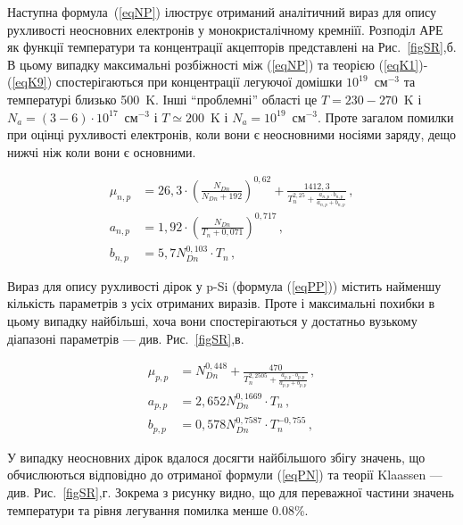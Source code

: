 \documentclass[14pt,a4paper,titlepage,oneside]{book}
\numberwithin{equation}{part}
\begin{document}
Наступна формула~(\ref{eqNP}) ілюструє отриманий аналітичний вираз для опису рухливості неосновних електронів у
монокристалічному кремніїї.
Розподіл АРЕ як функції температури та концентрації акцепторів представлені на Рис.~\ref{figSR},б.
В цьому випадку максимальні розбіжності між (\ref{eqNP}) та теорією (\ref{eqK1})-(\ref{eqK9}) спостерігаються при
концентрації легуючої домішки $10^{19}$~см$^{-3}$ та температурі близько 500~K.
Інші ``проблемні'' області це $T=230-270$~K і $N_a=(3-6)\cdot 10^{17}$~см$^{-3}$ і
$T\simeq200$~K і $N_a=10^{19}$~см$^{-3}$.
Проте загалом помилки при оцінці рухливості електронів, коли вони є неосновними носіями заряду, дещо нижчі
ніж коли вони є основними.

\begin{subequations} \label{eqNP}
    \begin{align}
      \mu_{n,p}& =26,3\cdot\left(\frac{N_{Dn}}{N_{Dn}+192}\right)^{0,62}+\frac{1412,3}{T_n^{2,25}+\frac{a_{n,p}\cdot b_{n,p}}{a_{n,p}+b_{n,p}}}\,, \label{eqNPa} \\
      a_{n,p} &=1,92\cdot\left(\frac{N_{Dn}}{T_n+0,071}\right)^{0,717}\,, \label{eqNPb} \\
      b_{n,p}& =5,7N_{Dn}^{0,103}\cdot T_n\,, \label{eqNPc}
    \end{align}
\end{subequations}

Вираз для опису рухливості дірок у p-Si (формула (\ref{eqPP})) містить найменшу кількість параметрів з усіх отриманих виразів.
Проте і максимальні похибки в цьому випадку найбільші, хоча вони спостерігаються у достатньо вузькому діапазоні
параметрів --- див. Рис.~\ref{figSR},в.

\begin{subequations} \label{eqPP}
    \begin{align}
      \mu_{p,p}& =N_{Dn}^{0,448}+\frac{470}{T_n^{2,2505}+\frac{a_{p,p}\cdot b_{p,p}}{a_{p,p}+b_{p,p}}}\,, \label{eqPPa} \\
      a_{p,p} &=2,652 N_{Dn}^{0,1669}\cdot T_n\,, \label{eqPPb} \\
      b_{p,p}& =0,578 N_{Dn}^{0,7587}\cdot T_n^{-0,755}\,, \label{eqPPc}
    \end{align}
\end{subequations}

У випадку неосновних дірок вдалося досягти найбільшого збігу значень,
що обчислюються відповідно до отриманої формули (\ref{eqPN})  та теорії Klaassen --- див. Рис.~\ref{figSR},г.
Зокрема з рисунку видно, що для переважної частини значень температури та рівня легування помилка менше 0.08\%.
\end{document}
